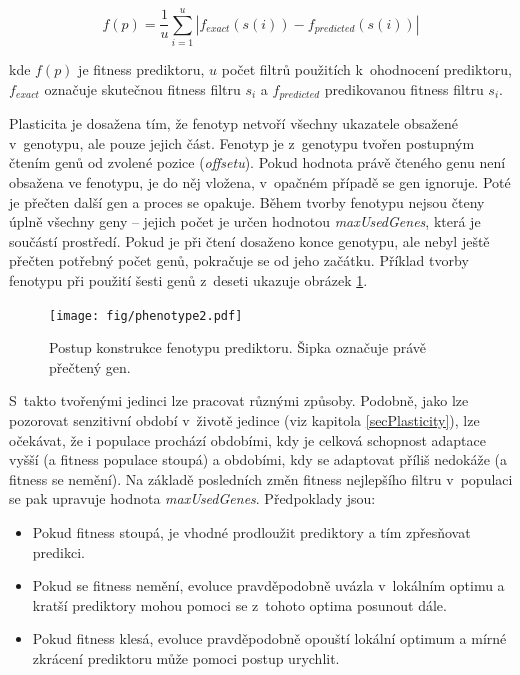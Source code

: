 \begin{equation}
    \label{eqDesignPredFitness}
    f \left( p \right) = \frac{1}{u} \sum\limits_{i=1}^{u} \left| f_{\mathit{exact}} \left( s \left( i \right) \right) - f_{\mathit{predicted}} \left( s \left( i \right) \right) \right|
\end{equation}

\noindent{}kde $f \left( p \right)$ je fitness prediktoru, $u$ počet filtrů použitích k~ohodnocení prediktoru, $f_{\mathit{exact}}$ označuje skutečnou fitness filtru $s_i$ a $f_{\mathit{predicted}}$ predikovanou fitness filtru $s_i$.

Plasticita je dosažena tím, že fenotyp netvoří všechny ukazatele obsažené v~genotypu, ale pouze jejich část. Fenotyp je z~genotypu tvořen postupným čtením genů od zvolené pozice (\emph{offsetu}). Pokud hodnota právě čteného genu není obsažena ve fenotypu, je do něj vložena, v~opačném případě se gen ignoruje. Poté je přečten další gen a proces se opakuje. Během tvorby fenotypu nejsou čteny úplně všechny geny -- jejich počet je určen hodnotou \emph{maxUsedGenes}, která je součástí prostředí. Pokud je při čtení dosaženo konce genotypu, ale nebyl ještě přečten potřebný počet genů, pokračuje se od jeho začátku. Příklad tvorby fenotypu při použití šesti genů z~deseti ukazuje obrázek \ref{obrFenotyp}.

\begin{figure}[htb]
    \centering\texttt{[image: fig/phenotype2.pdf]}
    \caption{Postup konstrukce fenotypu prediktoru. Šipka označuje právě přečtený gen.}
    \label{obrFenotyp}
\end{figure}

S~takto tvořenými jedinci lze pracovat různými způsoby. Podobně, jako lze pozorovat senzitivní období v~životě jedince (viz kapitola \ref{secPlasticity}), lze očekávat, že i populace prochází obdobími, kdy je celková schopnost adaptace vyšší (a fitness populace stoupá) a obdobími, kdy se adaptovat příliš nedokáže (a fitness se nemění). Na základě posledních změn fitness nejlepšího filtru v~populaci se pak upravuje hodnota \emph{maxUsedGenes}. Předpoklady jsou:

\begin{itemize}
    \item Pokud fitness stoupá, je vhodné prodloužit prediktory a tím zpřesňovat predikci.
    \item Pokud se fitness nemění, evoluce pravděpodobně uvázla v~lokálním optimu a kratší prediktory mohou pomoci se z~tohoto optima posunout dále.
    \item Pokud fitness klesá, evoluce pravděpodobně opouští lokální optimum a mírné zkrácení prediktoru může pomoci postup urychlit.
\end{itemize}

